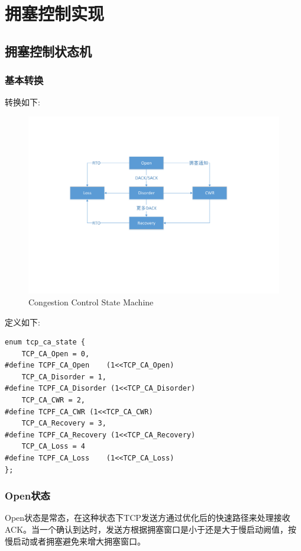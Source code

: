 \section{拥塞控制实现}

	\subsection{拥塞控制状态机}
		\subsubsection{基本转换}
		转换如下:
            \begin{figure}[htb]        
                \centering
                \includegraphics[width=\textwidth]  {images/Congestion Control State Machine.pdf}
				\caption{Congestion Control State Machine}
				\label{Congestion Control State Machine}
            \end{figure} 
	
		定义如下:
\begin{verbatim}
enum tcp_ca_state {
	TCP_CA_Open = 0,
#define TCPF_CA_Open	(1<<TCP_CA_Open)
	TCP_CA_Disorder = 1,
#define TCPF_CA_Disorder (1<<TCP_CA_Disorder)
	TCP_CA_CWR = 2,
#define TCPF_CA_CWR	(1<<TCP_CA_CWR)
	TCP_CA_Recovery = 3,
#define TCPF_CA_Recovery (1<<TCP_CA_Recovery)
	TCP_CA_Loss = 4
#define TCPF_CA_Loss	(1<<TCP_CA_Loss)
};
\end{verbatim}
		\subsubsection{Open状态}
			Open状态是常态，在这种状态下TCP发送方通过优化后的快速路径来处理接收ACK。当一个确认到达时，发送方根据拥塞窗口是小于还是大于慢启动阙值，按慢启动或者拥塞避免来增大拥塞窗口。


